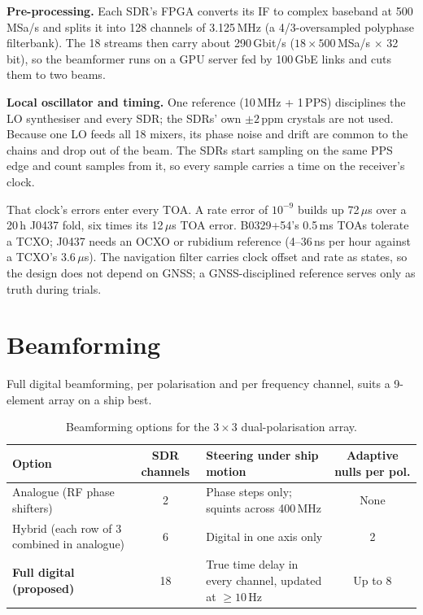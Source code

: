 \documentclass[11pt,a4paper]{article}
\begin{document}
\textbf{Pre-processing.} Each SDR's FPGA converts its IF to complex baseband at 500\,MSa/s and splits
it into 128 channels of 3.125\,MHz (a 4/3-oversampled polyphase filterbank). The 18 streams then carry
about 290\,Gbit/s ($18 \times 500$\,MSa/s $\times$ 32\,bit), so the beamformer runs on a GPU server fed
by 100\,GbE links and cuts them to two beams.

\textbf{Local oscillator and timing.} One reference (10\,MHz + 1\,PPS) disciplines the LO synthesiser
and every SDR; the SDRs' own $\pm2$\,ppm crystals are not used. Because one LO feeds all 18 mixers, its
phase noise and drift are common to the chains and drop out of the beam. The SDRs start sampling on the
same PPS edge and count samples from it, so every sample carries a time on the receiver's clock.

That clock's errors enter every TOA. A rate error of $10^{-9}$ builds up 72\,$\mu$s over a 20\,h J0437
fold, six times its 12\,$\mu$s TOA error. B0329+54's 0.5\,ms TOAs tolerate a TCXO; J0437 needs an OCXO
or rubidium reference (4--36\,ns per hour against a TCXO's 3.6\,$\mu$s). The navigation filter carries
clock offset and rate as states, so the design does not depend on GNSS; a GNSS-disciplined reference
serves only as truth during trials.

\section{Beamforming}

Full digital beamforming, per polarisation and per frequency channel, suits a 9-element array on a ship
best.

\begin{table}[ht]
\centering
\small
\renewcommand{\arraystretch}{1.15}
\begin{tabularx}{\linewidth}{@{}p{4.4cm}cXc@{}}
\toprule
Option & SDR channels & Steering under ship motion & Adaptive nulls per pol. \\
\midrule
Analogue (RF phase shifters) & 2 & Phase steps only; squints across 400\,MHz & None \\
Hybrid (each row of 3 combined in analogue) & 6 & Digital in one axis only & 2 \\
\textbf{Full digital (proposed)} & 18 & True time delay in every channel, updated at $\ge 10$\,Hz & Up to 8 \\
\bottomrule
\end{tabularx}
\caption{Beamforming options for the $3\times3$ dual-polarisation array.}
\label{tab:beam}
\end{table}
\end{document}

